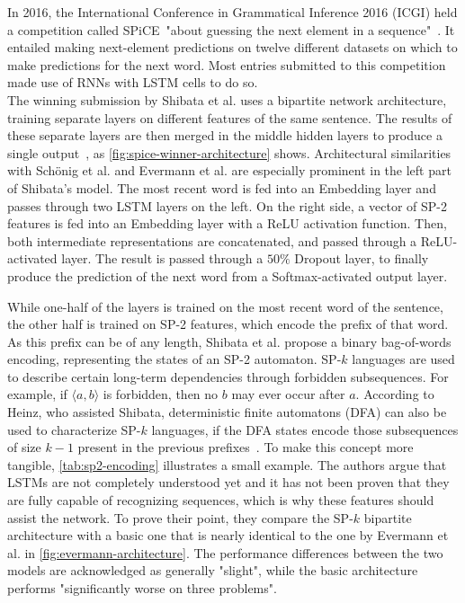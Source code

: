 In 2016, the International Conference in Grammatical Inference 2016 (ICGI) held a competition called SPiCE\ "about guessing the next element in a sequence"~\cite{web:spice}. It entailed making next-element predictions on twelve different datasets on which to make predictions for the next word. Most entries submitted to this competition made use of RNNs with LSTM cells to do so.\\

The winning submission by Shibata et al. uses a bipartite network architecture, training separate layers on different features of the same sentence. The results of these separate layers are then merged in the middle hidden layers to produce a single output~\cite{shibata2016bipartite}, as \autoref{fig:spice-winner-architecture} shows. Architectural similarities with Schönig et al. and Evermann et al. are especially prominent in the left part of Shibata's model.
The most recent word is fed into an Embedding layer and passes through two LSTM layers on the left.
On the right side, a vector of SP-2 features is fed into an Embedding layer with a ReLU activation function.
Then, both intermediate representations are concatenated, and passed through a ReLU-activated layer.
The result is passed through a $50\%$ Dropout layer, to finally produce the prediction of the next word from a Softmax-activated output layer.

While one-half of the layers is trained on the most recent word of the sentence, the other half is trained on SP-2 features, which encode the prefix of that word.
As this prefix can be of any length, Shibata et al. propose a binary bag-of-words encoding, representing the states of an SP-2 automaton.
SP-$k$ languages are used to describe certain long-term dependencies through forbidden subsequences. For example, if $\langle a,b \rangle$ is forbidden, then no $b$ may ever occur after $a$. According to Heinz, who assisted Shibata, deterministic finite automatons (DFA) can also be used to characterize SP-$k$ languages, if the DFA states encode those subsequences of size $k-1$ present in the previous prefixes~\cite{heinz2010estimatingSP}. To make this concept more tangible, \autoref{tab:sp2-encoding} illustrates a small example. The authors argue that LSTMs are not completely understood yet and it has not been proven that they are fully capable of recognizing sequences, which is why these features should assist the network. To prove their point, they compare the SP-$k$ bipartite architecture with a basic one that is nearly identical to the one by Evermann et al. in \autoref{fig:evermann-architecture}. The performance differences between the two models are acknowledged as generally "slight", while the basic architecture performs "significantly worse on three problems".

